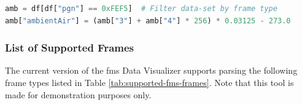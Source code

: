 \bigskip
{}
\begin{lstlisting}[backgroundcolor=\color{gray!10},  
                   basicstyle=\ttfamily,
                   columns=fullflexible,
                   breakatwhitespace=false,      
                   breaklines=true,                
                   captionpos=b,                    
                   commentstyle=\color{mygreen}, 
                   extendedchars=true,              
                   frame=single,                   
                   keepspaces=true,             
                   keywordstyle=\color{blue},      
                   language=Python,                 
                   numbers=none,                
                   numbersep=5pt,                   
                   numberstyle=\color{blue}, 
                   rulecolor=\color{mygray},        
                   showspaces=false,
                   showstringspaces=false,
                   showtabs=false,                 
                   stepnumber=5,                  
                   stringstyle=\color{mymauve},    
                   tabsize=2,                      
                   title=\lstname,
                   frame=none,
                   xleftmargin = 1cm,
                   framexleftmargin = 1em]
amb = df[df["pgn"] == 0xFEF5]  # Filter data-set by frame type
amb["ambientAir"] = (amb["3"] + amb["4"] * 256) * 0.03125 - 273.0
\end{lstlisting}
\newpage

\subsubsection{List of Supported Frames}
The current version of the \acrshort{fms} Data Visualizer supports parsing the following frame types listed in Table \ref{tab:supported-fms-frames}. Note that this tool is made for demonstration purposes only.

